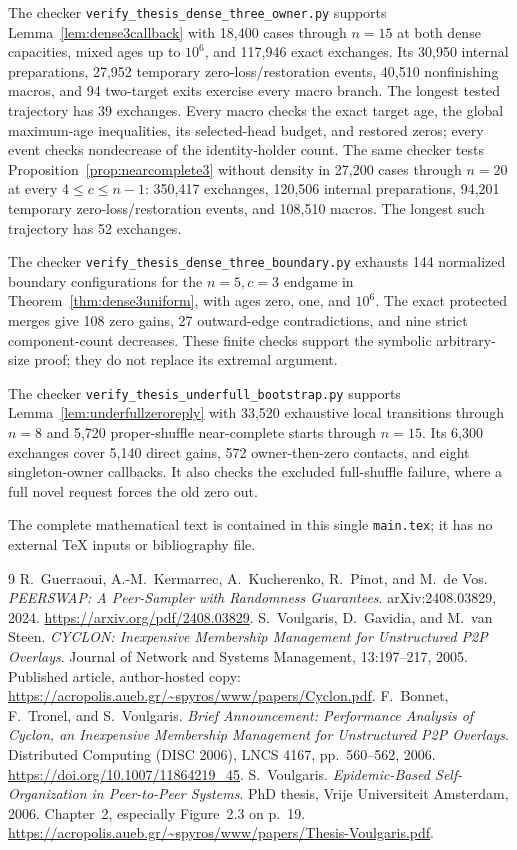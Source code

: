 \documentclass[11pt]{article}
\begin{document}
The checker \texttt{verify\_thesis\_dense\_three\_owner.py}
supports Lemma~\ref{lem:dense3callback} with 18,400 cases
through $n=15$ at both dense capacities, mixed ages up
to $10^6$, and 117,946 exact exchanges.
Its 30,950 internal preparations, 27,952 temporary
zero-loss/restoration events, 40,510 nonfinishing
macros, and 94 two-target exits exercise every
macro branch. The longest tested trajectory has
39 exchanges. Every macro checks the exact target age,
the global maximum-age inequalities, its selected-head
budget, and restored zeros; every event checks
nondecrease of the identity-holder count.
The same checker tests Proposition~\ref{prop:nearcomplete3}
without density in 27,200 cases through $n=20$
at every $4\le c\le n-1$: 350,417 exchanges,
120,506 internal preparations, 94,201 temporary
zero-loss/restoration events, and 108,510 macros.
The longest such trajectory has 52 exchanges.

The checker \texttt{verify\_thesis\_dense\_three\_boundary.py}
exhausts 144 normalized boundary configurations for
the $n=5,c=3$ endgame in
Theorem~\ref{thm:dense3uniform}, with ages zero,
one, and $10^6$. The exact protected merges give
108 zero gains, 27 outward-edge contradictions, and
nine strict component-count decreases.
These finite checks support the symbolic arbitrary-size
proof; they do not replace its extremal argument.

The checker \texttt{verify\_thesis\_underfull\_bootstrap.py}
supports Lemma~\ref{lem:underfullzeroreply} with
33,520 exhaustive local transitions through $n=8$
and 5,720 proper-shuffle near-complete starts
through $n=15$. Its 6,300 exchanges cover
5,140 direct gains, 572 owner-then-zero contacts,
and eight singleton-owner callbacks. It also
checks the excluded full-shuffle failure, where
a full novel request forces the old zero out.

The complete mathematical text is contained in this single
\texttt{main.tex}; it has no external TeX inputs or bibliography file.

\begin{thebibliography}{9}
R.~Guerraoui, A.-M.~Kermarrec, A.~Kucherenko, R.~Pinot, and M.~de Vos.
\emph{PEERSWAP: A Peer-Sampler with Randomness Guarantees}.
arXiv:2408.03829, 2024.
\url{https://arxiv.org/pdf/2408.03829}.
S.~Voulgaris, D.~Gavidia, and M.~van Steen.
\emph{CYCLON: Inexpensive Membership Management for Unstructured P2P
Overlays}. Journal of Network and Systems Management, 13:197--217,
2005. Published article, author-hosted copy:
\url{https://acropolis.aueb.gr/~spyros/www/papers/Cyclon.pdf}.
F.~Bonnet, F.~Tronel, and S.~Voulgaris.
\emph{Brief Announcement: Performance Analysis of Cyclon,
an Inexpensive Membership Management for Unstructured P2P Overlays}.
Distributed Computing (DISC 2006), LNCS 4167, pp.~560--562, 2006.
\url{https://doi.org/10.1007/11864219_45}.
S.~Voulgaris.
\emph{Epidemic-Based Self-Organization in Peer-to-Peer Systems}.
PhD thesis, Vrije Universiteit Amsterdam, 2006.
Chapter~2, especially Figure~2.3 on p.~19.
\url{https://acropolis.aueb.gr/~spyros/www/papers/Thesis-Voulgaris.pdf}.
\end{thebibliography}
\end{document}
